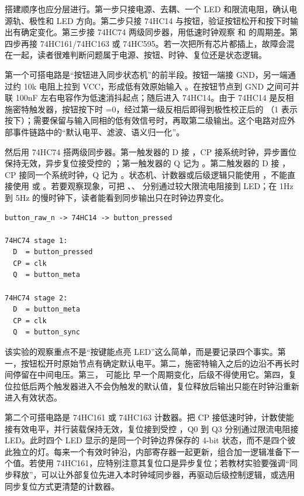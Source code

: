 搭建顺序也应分层进行。第一步只接电源、去耦、一个 LED 和限流电阻，确认电源轨、极性和 LED 方向。第二步只接 74HC14 与按钮，验证按钮松开和按下时输出有确定变化。第三步接 74HC74 两级同步器，用低速时钟观察  和  的周期差。第四步再接 74HC161/74HC163 或 74HC595。若一次把所有芯片都插上，故障会混在一起，读者很难判断问题属于电源、按钮、时钟、复位还是状态逻辑。

第一个可搭电路是“按钮进入同步状态机”的前半段。按钮一端接 GND，另一端通过约 10k 电阻上拉到 VCC，形成低有效原始输入 。在按钮节点到 GND 之间可并联 100nF 左右电容作为低速消抖起点；随后进入 74HC14。由于 74HC14 是反相施密特触发器，按钮按下时 =0，经过第一级反相后即得到极性校正后的 （1 表示按下）；需要保留与输入同相的低有效信号时，再取第二级输出。这个电路对应外部事件链路中的“默认电平、滤波、语义归一化”。

然后用 74HC74 搭两级同步器。第一触发器的 D 接 ，CP 接系统时钟，异步置位保持无效，异步复位接受控的 ；第一触发器的 Q 记为 。第二触发器的 D 接 ，CP 接同一个系统时钟，Q 记为 。状态机、计数器或后级逻辑只能使用 ，不能直接使用  或 。若要观察现象，可把 、、 分别通过较大限流电阻接到 LED；在 1Hz 到 5Hz 的慢时钟下，读者能看到同步输出只在时钟边界变化。

\begin{lstlisting}
button_raw_n -> 74HC14 -> button_pressed

74HC74 stage 1:
  D  = button_pressed
  CP = clk
  Q  = button_meta

74HC74 stage 2:
  D  = button_meta
  CP = clk
  Q  = button_sync
\end{lstlisting}

该实验的观察重点不是“按键能点亮 LED”这么简单，而是要记录四个事实。第一，按钮松开时原始节点有确定默认电平。第二，施密特输入之后的边沿不再长时间停留在中间电压。第三， 可能比  早一个周期变化，后级不得使用它。第四，复位拉低后两个触发器进入不会伪触发的默认值，复位释放后输出只能在时钟沿重新进入有效状态。

第二个可搭电路是 74HC161 或 74HC163 计数器。把 CP 接低速时钟，计数使能接有效电平，并行装载保持无效，复位接到受控 ，Q0 到 Q3 分别通过限流电阻接 LED。此时四个 LED 显示的是同一个时钟边界保存的 4-bit 状态，而不是四个彼此独立的灯。每来一个有效时钟沿，内部寄存器一起更新，组合加一逻辑准备下一个值。若使用 74HC161，应特别注意其复位口是异步复位；若教材实验要强调“同步释放”，可以让外部复位先进入本时钟域同步器，再驱动后级控制逻辑，或选用同步复位方式更清楚的计数器。

